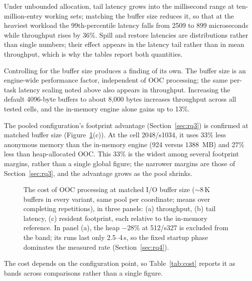 Under unbounded allocation, tail latency grows into the millisecond range at ten-million-entry working sets; matching the buffer size reduces it, so that at the heaviest workload the 99th-percentile latency falls from 2509 to 899 microseconds while throughput rises by 36\%.
Spill and restore latencies are distributions rather than single numbers; their effect appears in the latency tail rather than in mean throughput, which is why the tables report both quantities.

Controlling for the buffer size produces a finding of its own.
The buffer size is an engine-wide performance factor, independent of \ac{OOC} processing; the same per-task latency scaling noted above also appears in throughput.
Increasing the default 4096-byte buffers to about 8{,}000 bytes increases throughput across all tested cells, and the in-memory engine alone gains up to 13\%.

The pooled configuration's footprint advantage (Section~\ref{sec:rq3}) is confirmed at matched buffer size (Figure~\ref{fig:cost}(c)).
At the cell 2048/s1034, it uses 33\% less anonymous memory than the in-memory engine (924 versus 1388\, MB) and 27\% less than heap-allocated \ac{OOC}.
This 33\% is the widest among several footprint margins, rather than a single global figure; the narrower margins are those of Section~\ref{sec:rq3}, and the advantage grows as the pool shrinks.

\begin{figure}[htbp]
\centering
{}
\caption[The cost of out-of-core processing]{The cost of \ac{OOC} processing
at matched I/O buffer size ($\sim$8\,K buffers in every variant, same pool per
coordinate; means over completing repetitions), in three panels: (a) throughput,
(b) tail latency, (c) resident footprint, each relative to the in-memory
reference. In panel (a), the heap $-28\%$ at 512/s327 is excluded from the band;
its runs last only 2.5--4\,s, so the fixed startup phase dominates the measured
rate (Section~\ref{sec:rq4}).\methodsnote}
\label{fig:cost}
\end{figure}

The cost depends on the configuration point, so Table~\ref{tab:cost} reports it as
bands across comparisons rather than a single figure.


